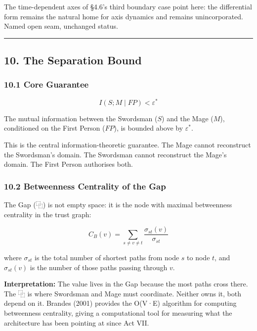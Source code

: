 \documentclass[
  11pt,
]{article}
\begin{document}
The time-dependent axes of §4.6's third boundary case point here: the
differential form remains the natural home for axis dynamics and remains
unincorporated. Named open seam, unchanged status.

\begin{center}\rule{0.5\linewidth}{0.5pt}\end{center}

\subsection{10. The Separation Bound}\label{the-separation-bound}

\subsubsection{10.1 Core Guarantee}\label{core-guarantee}

\[I(S ; M \mid FP) < \varepsilon^*\]

The mutual information between the Swordsman (\(S\)) and the Mage
(\(M\)), conditioned on the First Person (\(FP\)), is bounded above by
\(\varepsilon^*\).

This is the central information-theoretic guarantee. The Mage cannot
reconstruct the Swordsman's domain. The Swordsman cannot reconstruct the
Mage's domain. The First Person authorises both.

\subsubsection{10.2 Betweenness Centrality of the
Gap}\label{betweenness-centrality-of-the-gap}

The Gap (⿻) is not empty space: it is the node with maximal betweenness
centrality in the trust graph:

\[C_B(v) = \sum_{s \neq v \neq t} \frac{\sigma_{st}(v)}{\sigma_{st}}\]

where \(\sigma_{st}\) is the total number of shortest paths from node
\(s\) to node \(t\), and \(\sigma_{st}(v)\) is the number of those paths
passing through \(v\).

\textbf{Interpretation:} The value lives in the Gap because the most
paths cross there. The ⿻ is where Swordsman and Mage must coordinate.
Neither owns it, both depend on it. Brandes (2001) provides the O(V·E)
algorithm for computing betweenness centrality, giving a computational
tool for measuring what the architecture has been pointing at since Act
VII.
\end{document}
